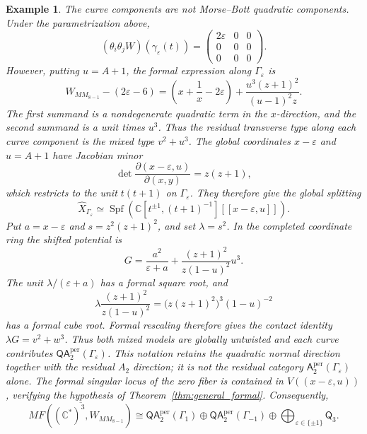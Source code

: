 \documentclass[11pt]{amsart}
\newtheorem{example}{Example}[section]
\newcommand{\MorseCat}[1]{\mathsf{Q}_{#1}}
\newcommand{\Aper}[2]{\mathsf{A}^{\mathrm{per}}_{#2}(#1)}
\newcommand{\QAper}[2]{\mathsf{QA}^{\mathrm{per}}_{#2}(#1)}
\begin{document}
\begin{example}
The curve components are not Morse--Bott quadratic components. Under the
parametrization above,
\[
(\theta_i\theta_jW)(\gamma_{\varepsilon}(t))=
\begin{pmatrix}
2\varepsilon & 0 & 0 \\
0 & 0 & 0 \\
0 & 0 & 0
\end{pmatrix}.
\]
However, putting $u=A+1$, the formal expression along $\Gamma_{\varepsilon}$
is
\[
W_{MM_{8-1}}-(2\varepsilon-6)
=\left(x+\frac{1}{x}-2\varepsilon\right)
+\frac{u^3(z+1)^2}{(u-1)^2z}.
\]
The first summand is a nondegenerate quadratic term in the $x$-direction, and
the second summand is a unit times $u^3$. Thus the residual transverse type
along each curve component is the mixed type $v^2+u^3$. The global
coordinates $x-\varepsilon$ and $u=A+1$ have Jacobian minor
\[
\det\frac{\partial(x-\varepsilon,u)}{\partial(x,y)}
=z(z+1),
\]
which restricts to the unit $t(t+1)$ on $\Gamma_\varepsilon$. They therefore
give the global splitting
\[
\widehat X_{\Gamma_\varepsilon}
\simeq
\operatorname{Spf}\!\left(
\mathbb C[t^{\pm1},(t+1)^{-1}][[x-\varepsilon,u]]
\right).
\]
Put $a=x-\varepsilon$ and $s=z^2(z+1)^2$, and set $\lambda=s^2$. In the
completed coordinate ring the shifted potential is
\[
G=\frac{a^2}{\varepsilon+a}
+\frac{(z+1)^2}{z(1-u)^2}u^3.
\]
The unit $\lambda/(\varepsilon+a)$ has a formal square root, and
\[
\lambda\frac{(z+1)^2}{z(1-u)^2}
=\bigl(z(z+1)^2\bigr)^3(1-u)^{-2}
\]
has a formal cube root. Formal rescaling therefore gives the contact identity
$\lambda G=v^2+w^3$. Thus both mixed models are globally untwisted and each
curve contributes $\QAper{\Gamma_\varepsilon}{2}$. This notation retains the
quadratic normal direction together with the residual $A_2$ direction; it is
not the residual category $\Aper{\Gamma_\varepsilon}{2}$ alone.
The formal singular locus of the zero fiber is contained in
$V((x-\varepsilon,u))$, verifying the hypothesis of
Theorem~\ref{thm:general_formal}.
Consequently,
\[
\overline{MF((\mathbb{C}^*)^3,W_{MM_{8-1}})}
\cong
\QAper{\Gamma_1}{2}
\oplus
\QAper{\Gamma_{-1}}{2}
\oplus
\bigoplus_{\varepsilon\in\{\pm1\}}\MorseCat{3}.
\]
\end{example}
\end{document}
